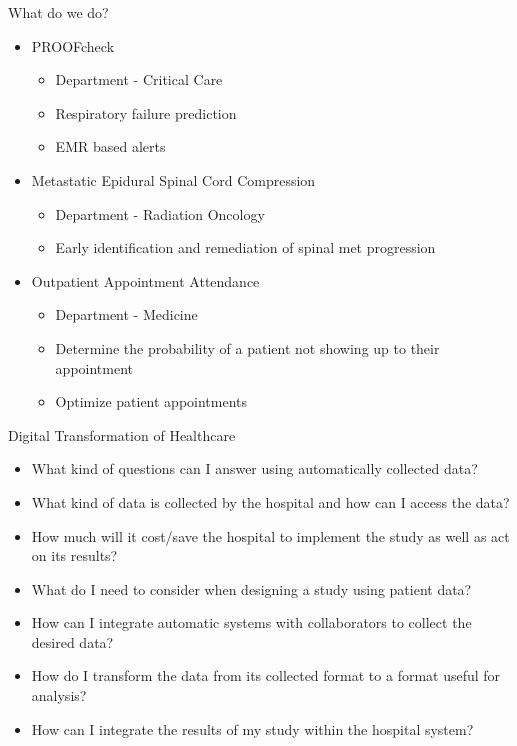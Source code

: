 \documentclass[10pt]{beamer}
\begin{document}
\begin{frame}{What do we do?}
	\begin{itemize}
		\item PROOFcheck
			\begin{itemize}
					\item Department - Critical Care
					\item Respiratory failure prediction
					\item EMR based alerts
			\end{itemize}
		\item Metastatic Epidural Spinal Cord Compression
			\begin{itemize}
				\item Department - Radiation Oncology
				\item Early identification and remediation of spinal met progression
			\end{itemize}
		\item Outpatient Appointment Attendance 
			\begin{itemize}
				\item Department - Medicine
				\item Determine the probability of a patient not showing up to their appointment
				\item Optimize patient appointments
			\end{itemize}
	\end{itemize}
	
\end{frame}

\begin{frame}{Digital Transformation of Healthcare}
	\small
	\begin{itemize}
		\item What kind of questions can I answer using automatically collected data?
		\item What kind of data is collected by the hospital and how can I access the data?
		\item How much will it cost/save the hospital to implement the study as well as act on its results?
		\item What do I need to consider when designing a study using patient data? 
		\item How can I integrate automatic systems with collaborators to collect the desired data?
		\item How do I transform the data from its collected format to a format useful for analysis?
		\item How can I integrate the results of my study within the hospital system?
	\end{itemize}
\end{frame}
\end{document}
